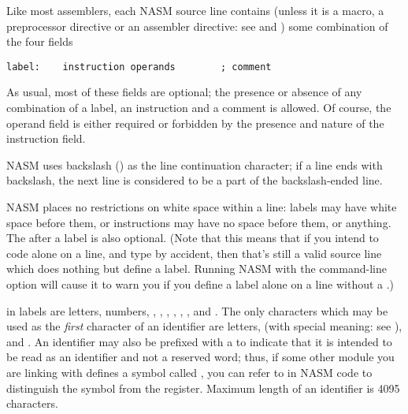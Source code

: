 %
%


Like most assemblers, each NASM source line contains (unless it
is a macro, a preprocessor directive or an assembler directive: see
 and ) some combination
of the four fields

\begin{lstlisting}
label:    instruction operands        ; comment
\end{lstlisting}

As usual, most of these fields are optional; the presence or absence
of any combination of a label, an instruction and a comment is allowed.
Of course, the operand field is either required or forbidden by the
presence and nature of the instruction field.

NASM uses backslash (\code{\textbackslash}) as the line continuation character;
if a line ends with backslash, the next line is considered to be
a part of the backslash-ended line.

NASM places no restrictions on white space within a line: labels may
have white space before them, or instructions may have no space
before them, or anything. The  after a label is also
optional. (Note that this means that if you intend to code 
alone on a line, and type  by accident, then that's still a
valid source line which does nothing but define a label. Running
NASM with the command-line option 
will cause it to warn you if you define a label alone on a line without
a .)

 in labels are letters, numbers, \code{\_},
\code{\$}, \code{\#}, \code{\@}, \code{~}, , and .
The only characters which may be used as the \emph{first} character of
an identifier are letters, \code{\.} (with special meaning: see
), \code{\_} and .
An identifier may also be prefixed with a \index{\$}
\code{\$} to indicate that it is intended to be read as an identifier
and not a reserved word; thus, if some other module you are linking with
defines a symbol called , you can refer to  in NASM
code to distinguish the symbol from the register. Maximum length of
an identifier is 4095 characters.

